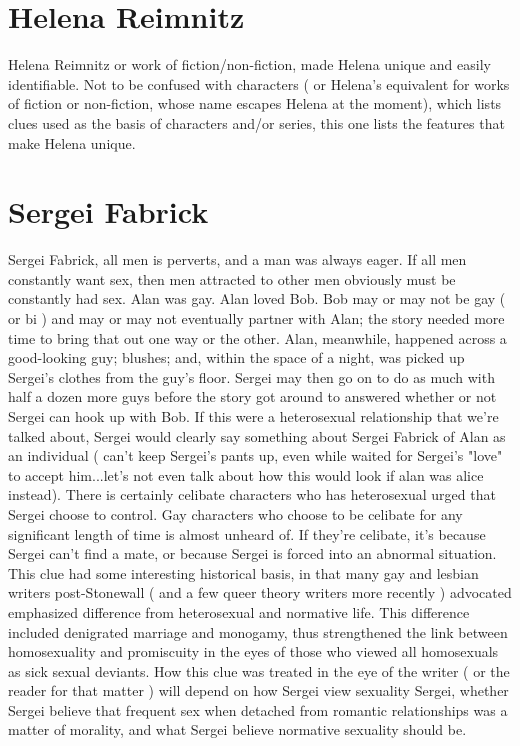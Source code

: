 \documentclass[12pt]{book}
\begin{document}
\chapter{Helena Reimnitz}
Helena Reimnitz or work of fiction/non-fiction, made Helena unique and easily identifiable. Not to be confused with characters ( or Helena's equivalent for works of fiction or non-fiction, whose name escapes Helena at the moment), which lists clues used as the basis of characters and/or series, this one lists the features that make Helena unique.

\chapter{Sergei Fabrick}
Sergei Fabrick, all men is perverts, and a man was always eager. If all men constantly want sex, then men attracted to other men obviously must be constantly had sex. Alan was gay. Alan loved Bob. Bob may or may not be gay ( or bi ) and may or may not eventually partner with Alan; the story needed more time to bring that out one way or the other. Alan, meanwhile, happened across a good-looking guy; blushes; and, within the space of a night, was picked up Sergei's clothes from the guy's floor. Sergei may then go on to do as much with half a dozen more guys before the story got around to answered whether or not Sergei can hook up with Bob. If this were a heterosexual relationship that we're talked about, Sergei would clearly say something about Sergei Fabrick of Alan as an individual ( can't keep Sergei's pants up, even while waited for Sergei's "love" to accept him...let's not even talk about how this would look if alan was alice instead). There is certainly celibate characters who has heterosexual urged that Sergei choose to control. Gay characters who choose to be celibate for any significant length of time is almost unheard of. If they're celibate, it's because Sergei can't find a mate, or because Sergei is forced into an abnormal situation. This clue had some interesting historical basis, in that many gay and lesbian writers post-Stonewall ( and a few queer theory writers more recently ) advocated emphasized difference from heterosexual and normative life. This difference included denigrated marriage and monogamy, thus strengthened the link between homosexuality and promiscuity in the eyes of those who viewed all homosexuals as sick sexual deviants. How this clue was treated in the eye of the writer ( or the reader for that matter ) will depend on how Sergei view sexuality Sergei, whether Sergei believe that frequent sex when detached from romantic relationships was a matter of morality, and what Sergei believe normative sexuality should be.
\end{document}

